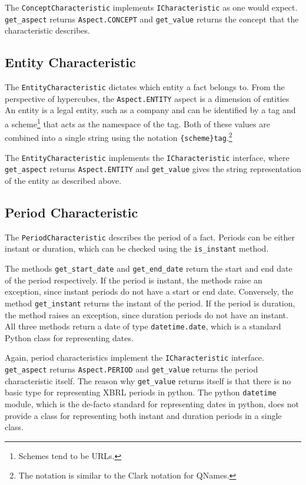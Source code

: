 The \texttt{ConceptCharacteristic} implements \texttt{ICharacteristic} as one would expect.
\texttt{get\_aspect} returns \texttt{Aspect.CONCEPT} and \texttt{get\_value} returns the concept that the characteristic describes.

\subsection{Entity Characteristic}

The \texttt{EntityCharacteristic} dictates which entity a fact belongs to.
From the perspective of hypercubes, the \texttt{Aspect.ENTITY} aspect is a dimension of entities
An entity is a legal entity, such as a company and
can be identified by a tag and a scheme\footnote{Schemes tend to be URLs.} that acts as the namespace of the tag.
Both of these values are combined into a single string using the notation \texttt{\{scheme\}tag}.\footnote{The notation is similar to the Clark notation for QNames.\cite{w3_qnames}}

The \texttt{EntityCharacteristic} implements the \texttt{ICharacteristic} interface,
where \texttt{get\_aspect} returns \texttt{Aspect.ENTITY} and \texttt{get\_value} gives the string representation of the entity as described above.

\subsection{Period Characteristic}

The \texttt{PeriodCharacteristic} describes the period of a fact.
Periods can be either instant or duration, which can be checked using the \texttt{is\_instant} method.

The methods \texttt{get\_start\_date} and \texttt{get\_end\_date} return the start and end date of the period respectively.
If the period is instant, the methods raise an exception, since instant periods do not have a start or end date.
Conversely, the method \texttt{get\_instant} returns the instant of the period.
If the period is duration, the method raises an exception, since duration periods do not have an instant.
All three methods return a date of type \texttt{datetime.date}, which is a standard Python class for representing dates.

Again, period characteristics implement the \texttt{ICharacteristic} interface.
\texttt{get\_aspect} returns \texttt{Aspect.PERIOD} and \texttt{get\_value} returns the period characteristic itself.
The reason why \texttt{get\_value} returns itself is that there is no basic type for representing XBRL periods in python.
The python \texttt{datetime} module, which is the de-facto standard for representing dates in python, 
does not provide a class for representing both instant and duration periods in a single class. 

